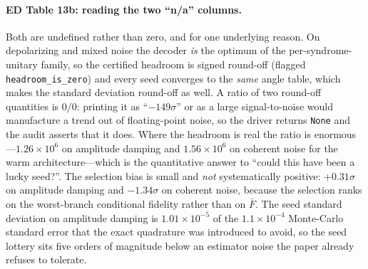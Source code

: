 \documentclass[10pt,a4paper]{article}
\begin{document}
\paragraph*{ED Table 13b: reading the two ``n/a'' columns.}
Both are undefined rather than zero, and for one underlying reason.  On
depolarizing and mixed noise the decoder \emph{is} the optimum of the
per-syndrome-unitary family, so the certified headroom is signed round-off
(flagged \texttt{headroom\_is\_zero}) and every seed converges to the \emph{same}
angle table, which makes the standard deviation round-off as well.  A ratio of two
round-off quantities is $0/0$: printing it as ``$-149\sigma$'' or as a large
signal-to-noise would manufacture a trend out of floating-point noise, so the
driver returns \texttt{None} and the audit asserts that it does.  Where the
headroom is real the ratio is enormous---$1.26\times 10^{6}$ on amplitude damping and $1.56\times 10^{6}$ on
coherent noise for the warm architecture---which is the quantitative answer to
``could this have been a lucky seed?''.  The selection bias is small and \emph{not}
systematically positive: $+0.31\sigma$ on amplitude damping and $-1.34\sigma$ on
coherent noise, because the selection ranks on the worst-branch conditional
fidelity rather than on $\bar F$.  The seed standard deviation on amplitude damping
is $1.01\times 10^{-5}$ of the $1.1\times10^{-4}$ Monte-Carlo standard error that the exact
quadrature was introduced to avoid, so the seed lottery sits five orders of
magnitude below an estimator noise the paper already refuses to tolerate.
\end{document}
